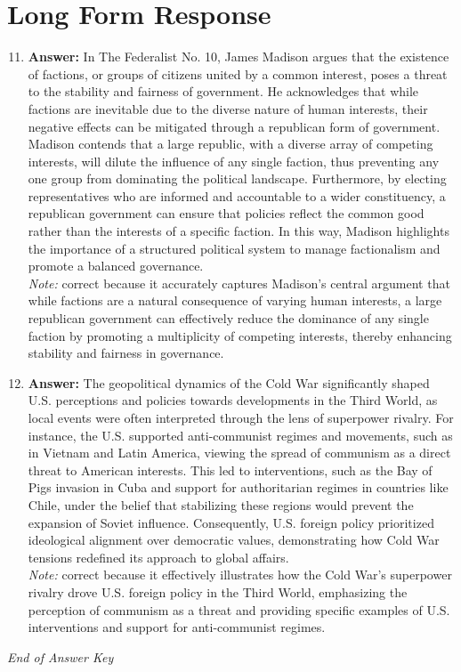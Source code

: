 \documentclass[12pt]{article}
\begin{document}
\section*{Long Form Response}
\begin{enumerate}[label=\arabic*.]
\setcounter{enumi}{10}
\item \textbf{Answer:} In The Federalist No. 10, James Madison argues that the existence of factions, or groups of citizens united by a common interest, poses a threat to the stability and fairness of government. He acknowledges that while factions are inevitable due to the diverse nature of human interests, their negative effects can be mitigated through a republican form of government. Madison contends that a large republic, with a diverse array of competing interests, will dilute the influence of any single faction, thus preventing any one group from dominating the political landscape. Furthermore, by electing representatives who are informed and accountable to a wider constituency, a republican government can ensure that policies reflect the common good rather than the interests of a specific faction. In this way, Madison highlights the importance of a structured political system to manage factionalism and promote a balanced governance.
\\ \textit{Note:} correct because it accurately captures Madison's central argument that while factions are a natural consequence of varying human interests, a large republican government can effectively reduce the dominance of any single faction by promoting a multiplicity of competing interests, thereby enhancing stability and fairness in governance.
\item \textbf{Answer:} The geopolitical dynamics of the Cold War significantly shaped U.S. perceptions and policies towards developments in the Third World, as local events were often interpreted through the lens of superpower rivalry. For instance, the U.S. supported anti-communist regimes and movements, such as in Vietnam and Latin America, viewing the spread of communism as a direct threat to American interests. This led to interventions, such as the Bay of Pigs invasion in Cuba and support for authoritarian regimes in countries like Chile, under the belief that stabilizing these regions would prevent the expansion of Soviet influence. Consequently, U.S. foreign policy prioritized ideological alignment over democratic values, demonstrating how Cold War tensions redefined its approach to global affairs.
\\ \textit{Note:} correct because it effectively illustrates how the Cold War's superpower rivalry drove U.S. foreign policy in the Third World, emphasizing the perception of communism as a threat and providing specific examples of U.S. interventions and support for anti-communist regimes.
\end{enumerate}

\vfill
\noindent\textit{End of Answer Key}
\end{document}
